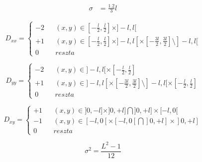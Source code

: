 \begin{align}
\sigma &= \frac{1.2}{3}l
\label{eqn:sigma_o_i_l}
\end{align}


\begin{equation}
D_{xx} = \left\lbrace \begin{array}{ccl}
-2&&  (x,y) \in [-\frac{l}{2},\frac{l}{2}]\times]-l,l[\\
+1&&  (x,y) \in [-\frac{l}{2},\frac{l}{2}]\times]-l,l[\times[-\frac{3l}{2},\frac{3l}{2}]\setminus]-l,l[ \\
0 && reszta
\end{array} \right.
\end{equation}

\begin{equation}
D_{yy} = \left\lbrace \begin{array}{ccl}
-2&&  (x,y) \in ]-l,l[\times[-\frac{l}{2},\frac{l}{2}]\\
+1&&  (x,y) \in ]-l,l[\times[-\frac{3l}{2},\frac{3l}{2}]\setminus]-l,l[\times[-\frac{l}{2},\frac{l}{2}] \\
0 && reszta 
\end{array} \right.
\end{equation}

\begin{equation}
D_{xy} = \left\lbrace \begin{array}{ccl}
+1&&  (x,y) \in ]0,-l]\times]0,+l]\bigcap]0,+l]\times[-l,0[ \\
-1&&  (x,y) \in [-l,0[\times[-l,0[\bigcap]0,+l]\times]0,+l]\\
0 && reszta
\end{array} \right.
\end{equation}




\begin{equation}
\sigma^2=\frac{L^2-1}{12}
\label{eqn:sigma_2_L}
\end{equation}


 

